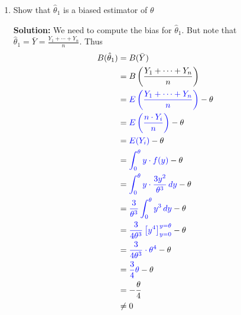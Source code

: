 \documentclass[12pt]{article}
\newcommand{\pars}[1]{\left( {#1} \right) }
\newcommand{\ybar}{\bar{Y}}
\newcommand{\E}[1]{E\left( {#1} \right)}
\begin{document}
\begin{enumerate}
\begin{enumerate}
        \item 
        Show that $\hat{\theta}_1$ is a biased estimator of $\theta$
        \begin{mybox}
            \textbf{Solution: } We need to compute the bias for $\hat{\theta}_1$. But note that $\hat{\theta}_1 = \ybar = \frac{Y_1 + \cdots + Y_n}{n}$. Thus
            \begin{align}
            B(\hat{\theta}_1) &= B(\ybar) \notag\\
            &= B\pars{\frac{Y_1 + \cdots + Y_n}{n}} \notag\\
            &= \color{blue}\E{\frac{Y_1 + \cdots + Y_n}{n}}\color{black} - \theta \notag\\
            &= \color{blue}E\pars{\frac{n\cdot Y_i}{n}}\color{black} - \theta \notag\\
            &= \color{blue}E(Y_i)\color{black} - \theta \notag\\
            &= \color{blue}\int_0^{\theta} y \cdot f(y) \color{black} - \theta \notag\\
            &= \color{blue}\int_0^{\theta} y \cdot \frac{3y^2}{\theta^3}\,dy \color{black} - \theta \notag\\
            &= \color{blue}\frac{3}{\theta^3} \int_0^{\theta} y^3 \,dy \color{black} - \theta \notag\\
            &= \color{blue}\frac{3}{4\theta^3} \left[ y^4 \right]_{y=0}^{y=\theta} \color{black} - \theta \notag\\
            &= \color{blue}\frac{3}{4\theta^3} \cdot \theta^4 \color{black} - \theta \notag\\
            &= \color{blue} \frac{3}{4} \theta \color{black} - \theta \notag\\
            &= -\frac{\theta}{4} \notag\\
            &\neq 0 \notag
            \end{align}
            \begin{center}\color{magenta}\color{black}\end{center}
        \end{mybox}
        

\end{enumerate}
\end{enumerate}
\end{document}
